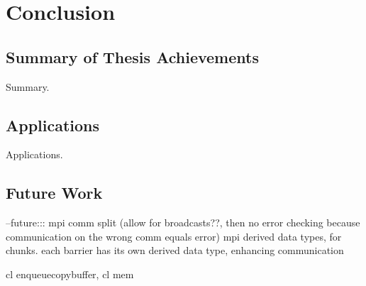 \documentclass[../thesis.tex]{subfiles}
\begin{document}
\chapter{Conclusion}

\label{ch:conclusions}

\section{Summary of Thesis Achievements}

Summary.


\section{Applications}

Applications.


\section{Future Work}

--future:::
mpi comm split (allow for broadcasts??, then no error checking because communication on the wrong comm equals error)
mpi derived data types, for chunks. each barrier has its own derived data type, enhancing communication

cl enqueuecopybuffer, cl mem
\end{document}
